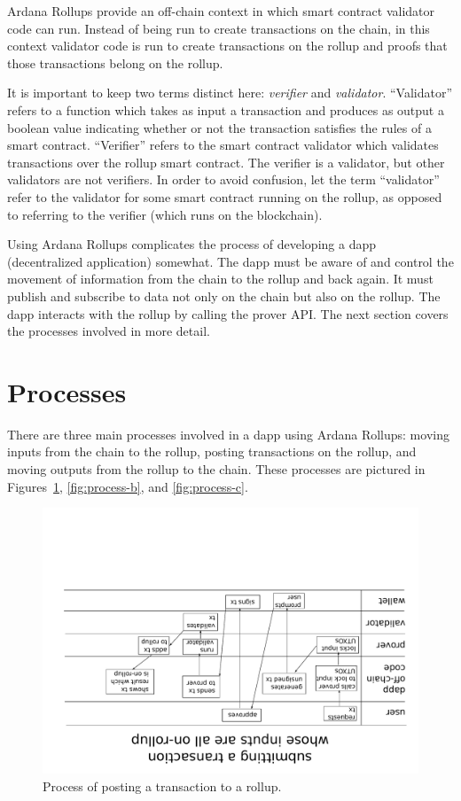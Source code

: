 \documentclass[12pt]{article}
\begin{document}
Ardana Rollups provide an off-chain context in which smart contract validator code can run. Instead of being run to create transactions on the chain, in this context validator code is run to create transactions on the rollup and proofs that those transactions belong on the rollup.

It is important to keep two terms distinct here: \emph{verifier}\/ and \emph{validator}. ``Validator'' refers to a function which takes as input a transaction and produces as output a boolean value indicating whether or not the transaction satisfies the rules of a smart contract. ``Verifier'' refers to the smart contract validator which validates transactions over the rollup smart contract. The verifier is a validator, but other validators are not verifiers. In order to avoid confusion, let the term ``validator'' refer to the validator for some smart contract running on the rollup, as opposed to referring to the verifier (which runs on the blockchain).

Using Ardana Rollups complicates the process of developing a dapp (decentralized application) somewhat. The dapp must be aware of and control the movement of information from the chain to the rollup and back again. It must publish and subscribe to data not only on the chain but also on the rollup. The dapp interacts with the rollup by calling the prover API. The next section covers the processes involved in more detail.


\section{Processes}

There are three main processes involved in a dapp using Ardana Rollups: moving inputs from the chain to the rollup, posting transactions on the rollup, and moving outputs from the rollup to the chain. These processes are pictured in Figures~\ref{fig:process-a}, \ref{fig:process-b}, and \ref{fig:process-c}.

\begin{figure}
	\includegraphics[angle=180,width=1.0\columnwidth]{process-diagram-a.pdf}
	\caption{Process of posting a transaction to a rollup.}
	\label{fig:process-a}
\end{figure}
\end{document}
